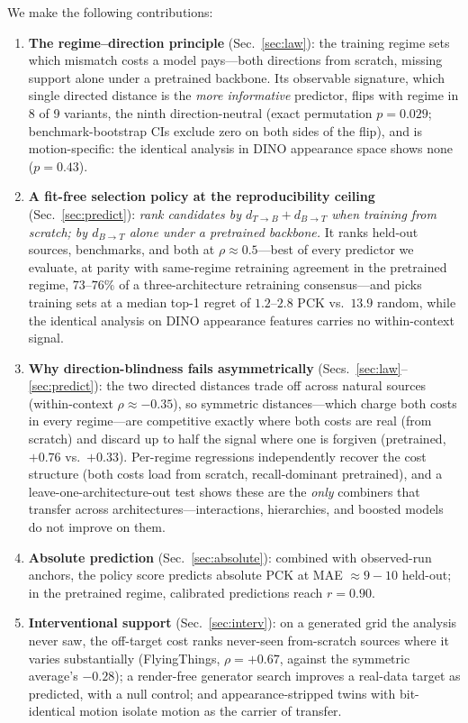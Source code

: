 \documentclass[runningheads]{llncs}
\newcommand{\dtb}{d_{T\to B}}
\newcommand{\dbt}{d_{B\to T}}
\newcommand{\pck}{PCK}
\begin{document}
We make the following contributions:
\begin{enumerate}
\item \textbf{The regime--direction principle} (Sec.~\ref{sec:law}): the
  training regime sets which mismatch costs a model pays---both directions
  from scratch, missing support alone under a pretrained backbone. Its
  observable signature, which single directed distance is the \emph{more
  informative} predictor, flips with regime in 8 of 9 variants, the ninth
  direction-neutral (exact permutation $p{=}0.029$; benchmark-bootstrap CIs
  exclude zero on both sides of the flip), and is motion-specific: the
  identical analysis in DINO appearance space shows none ($p{=}0.43$).
\item \textbf{A fit-free selection policy at the reproducibility ceiling}
  (Sec.~\ref{sec:predict}): \emph{rank candidates by $\dtb{+}\dbt$ when
  training from scratch; by $\dbt$ alone under a pretrained backbone.} It
  ranks held-out sources, benchmarks, and both at $\rho \approx 0.5$---best
  of every predictor we evaluate, at parity with same-regime retraining
  agreement in the pretrained regime, $73$--$76\%$ of a three-architecture
  retraining consensus---and picks training sets at a median top-1 regret of
  $1.2$--$2.8$ \pck{} vs.\ $13.9$ random, while the identical analysis on
  DINO appearance features carries no within-context signal.
\item \textbf{Why direction-blindness fails asymmetrically}
  (Secs.~\ref{sec:law}--\ref{sec:predict}): the two directed distances
  trade off across natural sources (within-context $\rho \approx -0.35$),
  so symmetric distances---which charge both costs in every regime---are
  competitive exactly where both costs are real (from scratch) and discard
  up to half the signal where one is forgiven (pretrained,
  ${+}0.76$ vs.\ ${+}0.33$). Per-regime regressions independently recover
  the cost structure (both costs load from scratch, recall-dominant
  pretrained), and a leave-one-architecture-out test shows these are the \emph{only}
  combiners that transfer across architectures---interactions, hierarchies,
  and boosted models do not improve on them.
\item \textbf{Absolute prediction} (Sec.~\ref{sec:absolute}): combined with
  observed-run anchors, the policy score predicts absolute \pck{} at
  MAE ${\approx}9{-}10$ held-out; in the pretrained regime, calibrated
  predictions reach $r{=}0.90$.
\item \textbf{Interventional support} (Sec.~\ref{sec:interv}): on a
  generated grid the analysis never saw, the off-target cost ranks
  never-seen from-scratch sources where it varies substantially
  (FlyingThings, $\rho{=}{+}0.67$, against the symmetric average's $-0.28$);
  a render-free generator search improves a real-data target as predicted,
  with a null control; and appearance-stripped twins with bit-identical
  motion isolate motion as the carrier of transfer.
\end{enumerate}
\end{document}
